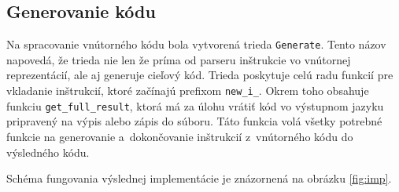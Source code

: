 \subsection{Generovanie kódu}
Na spracovanie vnútorného kódu bola vytvorená trieda \texttt{Generate}. Tento názov napovedá, že trieda nie len že príma od parseru inštrukcie vo vnútornej reprezentácií, ale aj generuje cieľový kód. Trieda poskytuje celú radu funkcií pre vkladanie inštrukcií, ktoré začínajú prefixom \texttt{new\_i\_}. Okrem toho obsahuje funkciu \texttt{get\_full\_result}, ktorá má za úlohu vrátiť kód vo výstupnom jazyku pripravený na výpis alebo zápis do súboru. Táto funkcia volá všetky potrebné funkcie na generovanie a~dokončovanie inštrukcií z~vnútorného kódu do výsledného kódu.

Schéma fungovania výslednej implementácie je znázornená na obrázku \ref{fig:imp}.

